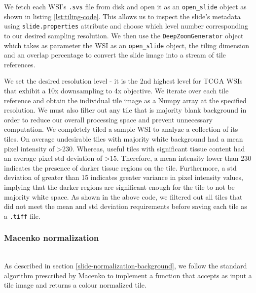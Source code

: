\documentclass{l4proj}
\begin{document}
We fetch each WSI's \texttt{.svs} file from disk and open it as an \texttt{open\_slide} object as shown in listing \ref{lst:tiling-code}. This allows us to inspect the slide's metadata using \texttt{slide.properties} attribute and choose which level number corresponding to our desired sampling resolution. We then use the \texttt{DeepZoomGenerator} object which takes as parameter the WSI as an \texttt{open\_slide} object, the tiling dimension and an overlap percentage to convert the slide image into a stream of tile references. 

We set the desired resolution level - it is the 2nd highest level for TCGA WSIs that exhibit a 10x downsampling to 4x objective. We iterate over each tile reference and obtain the individual tile image as a Numpy array at the specified resolution. We must also filter out any tile that is majority blank background in order to reduce our overall processing space and prevent unnecessary computation. We completely tiled a sample WSI to analyze a collection of its tiles. On average undesirable tiles with majority white background had a mean pixel intensity of >230. Whereas, useful tiles with significant tissue content had an average pixel std deviation of >15. Therefore, a mean intensity lower than 230 indicates the presence of darker tissue regions on the tile. Furthermore, a std deviation of greater than 15 indicates greater variance in pixel intensity values, implying that the darker regions are significant enough for the tile to not be majority white space. As shown in the above code, we filtered out all tiles that did not meet the mean and std deviation requirements before saving each tile as a \texttt{.tiff} file.
\\

\subsubsection{Macenko normalization}\hfill\\
As described in section \ref{slide-normalization-background}, we follow the standard algorithm prescribed by Macenko to implement a function that accepts as input a tile image and returns a colour normalized tile. 
\end{document}
